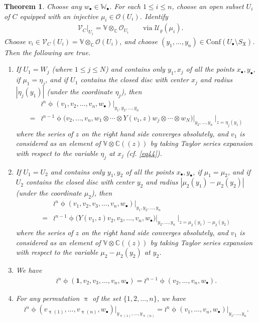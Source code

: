 \documentclass[12pt,a4paper,notitlepage]{article}
\theoremstyle{definition}
\theoremstyle{plain}
\newtheorem{thm}[df]{Theorem}
\newcommand{\fk}{\mathfrak}
\newcommand{\mc}{\mathcal}
\newcommand{\id}{\mathbf{1}}
\newcommand{\Conf}{\mathrm{Conf}}
\newcommand{\scr}{\mathscr}
\newcommand{\SX}{{S_{\fk X}}}
\newcommand{\blt}{\bullet}
\newcommand{\Vbb}{\mathbb V}
\newcommand{\Wbb}{\mathbb W}
\newcommand{\Cbb}{\mathbb C}
\numberwithin{equation}{subsection}
\begin{document}
\begin{thm}
Choose any $w_\blt\in\Wbb_\blt$. For each $1\leq i\leq n$, choose an open subset  $U_i$  of $C$ equipped with an injective $\mu_i\in\scr O(U_i)$. Identify 
\begin{align*}
	\scr V_C\big|_{U_i}=\Vbb\otimes_\Cbb\scr O_{U_i}	\qquad\text{via }\mc U_\varrho(\mu_i).
\end{align*}
Choose $v_i\in\scr V_C(U_i)=\Vbb\otimes_\Cbb\scr O(U_i)$, and choose $(y_1,\dots,y_n)\in\Conf(U_\blt\setminus\SX)$. Then the following are true.
\begin{enumerate}[label=(\arabic*)]
\item If $U_1=W_j$ (where $1\leq j\leq N$) and contains only $y_1,x_j$ of all the points $x_\blt,y_\blt$, if $\mu_1=\eta_j$, and if $U_1$ contains the closed disc with center $x_j$ and radius $|\eta_j(y_1)|$ (under the coordinate $\eta_j$), then
\begin{align}
&\wr^n\upphi(v_1,v_2,\dots,v_n,w_\blt)\big|_{y_1,y_2,\dots,y_n}\nonumber\\
=&\wr^{n-1}\upphi\big(v_2,\dots,v_n,w_1\otimes\cdots\otimes Y(v_1,z)w_j\otimes\cdots\otimes w_N\big)\big|_{y_2,\dots,y_n}~\big|_{z=\eta_j(y_1)}\label{eq8}
\end{align}
where the series of $z$ on the right hand side converges absolutely, and $v_1$ is considered as an element of $\Vbb\otimes\Cbb((z))$ by taking Taylor series expansion with respect to the variable $\eta_j$ at $x_j$ (cf. \eqref{eq44}).
\item If $U_1=U_2$ and contains only $y_1,y_2$ of all the  points $x_\blt,y_\blt$, if $\mu_1=\mu_2$, and if $U_2$ contains the closed disc with center $y_2$ and radius $|\mu_2(y_1)-\mu_2(y_2)|$ (under the coordinate $\mu_2$), then
\begin{align}
&\wr^n\upphi(v_1,v_2,v_3,\dots,v_n,w_\blt)\big|_{y_1,y_2,\dots,y_n}\nonumber\\
=&\wr^{n-1}\upphi\big(Y(v_1,z)v_2,v_3,\dots,v_n,w_\blt\big)\big |_{y_2,\dots,y_n}~\big |_{z=\mu_2(y_1)-\mu_2(y_2)}\label{eq9}
\end{align}
where the series of $z$ on the right hand side converges absolutely, and $v_1$ is considered as an element of $\Vbb\otimes\Cbb((z))$ by taking Taylor series expansion with respect to the variable $\mu_2-\mu_2(y_2)$ at $y_2$.
\item  We have
\begin{align}
\wr^n\upphi(\id,v_2,v_3,\dots,v_n,w_\blt)=\wr^{n-1}\upphi(v_2,\dots,v_n,w_\blt).
\end{align}
\item For any permutation $\uppi$ of the set $\{1,2,\dots,n\}$, we have
\begin{align}
\wr^n\upphi(v_{\uppi(1)},\dots,v_{\uppi(n)},w_\blt)\big|_{y_{\uppi(1)},\dots,y_{\uppi(n)}}=\wr^n\upphi(v_1,\dots,v_n,w_\blt)\big|_{y_1,\dots,y_n}.
\end{align}
\end{enumerate}
\end{thm}
\end{document}
